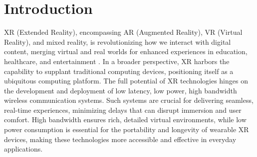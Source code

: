 \section{Introduction}


XR (Extended Reality), encompassing AR (Augmented Reality), VR (Virtual Reality), and mixed reality, is revolutionizing how we interact with digital content, merging virtual and real worlds for enhanced experiences in education, healthcare, and entertainment \cite{xr1, xr2, xr3, xr4}. In a broader perspective, XR harbors the capability to supplant traditional computing devices, positioning itself as a ubiquitous computing platform. The full potential of XR technologies hinges on the development and deployment of low latency, low power, high bandwidth wireless communication systems. Such systems are crucial for delivering seamless, real-time experiences, minimizing delays that can disrupt immersion and user comfort. High bandwidth ensures rich, detailed virtual environments, while low power consumption is essential for the portability and longevity of wearable XR devices, making these technologies more accessible and effective in everyday applications.



